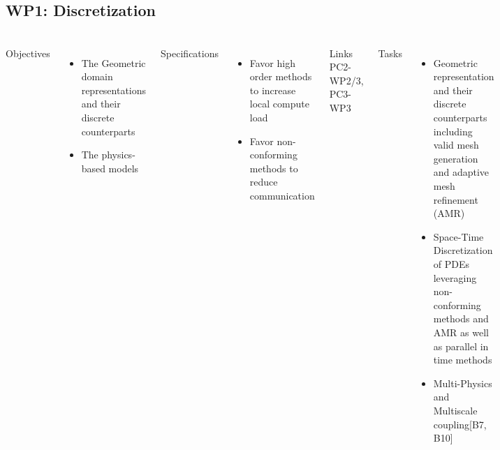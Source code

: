 \subsection{WP1: Discretization}
\begin{frame}
  \frametitle{\insertsectionhead}
  \framesubtitle{\insertsubsectionhead}

  \begin{columns}[t]
    Objectives
    \begin{itemize}
      \item The Geometric domain representations and their discrete counterparts 
      \item The physics-based models 
    \end{itemize}
    Specifications
    \begin{itemize}
      \item Favor high order methods to increase local compute load
      \item Favor non-conforming methods to reduce communication
    \end{itemize}
    \begin{alertblock}{Links}
      PC2-WP2/3, PC3-WP3 
    \end{alertblock}
    Tasks
    \begin{itemize}
      \item Geometric representation and their discrete counterparts  including valid mesh generation and adaptive mesh refinement (AMR) 
      \item Space-Time Discretization of PDEs leveraging non-conforming methods and AMR as well as parallel in time methods
      \item Multi-Physics and Multiscale coupling[B7, B10] 
    \end{itemize}


  \end{columns}
\end{frame}


